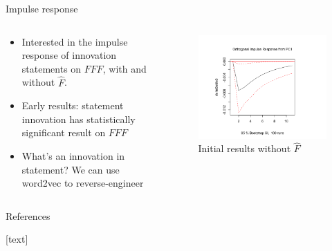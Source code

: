 \documentclass{beamer}
\begin{document}
\begin{frame}{Impulse response}
	
	\begin{columns}
		\begin{column}{0.5\textwidth}
			\begin{itemize}
				\item Interested in the impulse response of innovation statements on $FFF$, with and without $\hat{F}$.
				\item Early results: statement innovation has statistically significant result on $FFF$
				\item What's an innovation in statement? We can use word2vec to reverse-engineer
			\end{itemize}
		\end{column}
		\begin{column}{0.5\textwidth}
			\begin{figure}
				\includegraphics[width=\textwidth]{impulse_response.png}
				\caption{Initial results without $\hat{F}$}
			\end{figure}
		\end{column}
	\end{columns}
\end{frame}


\begin{frame}{References}
\nocite{gurkaynak2005actions}
\nocite{campbell2012macroeconomic}
\nocite{le2014distributed}
\nocite{mikolov2013efficient}
\nocite{bernanke2005measuring}

[text]



\end{frame}
\end{document}
